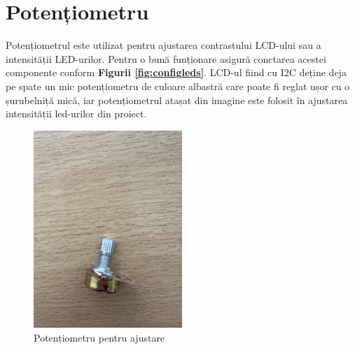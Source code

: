 \documentclass{report}
\begin{document}
\section{Potențiometru}
Potențiometrul este utilizat pentru ajustarea contrastului LCD-ului sau a intensității LED-urilor.
Pentru o bună funționare asigură conctarea acestei componente conform \textbf{Figurii \ref{fig:configleds}}.
LCD-ul fiind cu I2C deține deja pe spate un mic potențiometru de culoare albastră care poate fi reglat ușor cu o șurubelniță mică, iar potențiometrul atașat din imagine este folosit în ajustarea intensității led-urilor din proiect.
\begin{figure}[H]
    \centering
    \includegraphics[width=0.5\textwidth]{potentiometru.jpg}
    \caption{Potențiometru pentru ajustare }
    \label{fig:potentiometer}
\end{figure}
\newpage
\vspace*{1cm}
\end{document}
